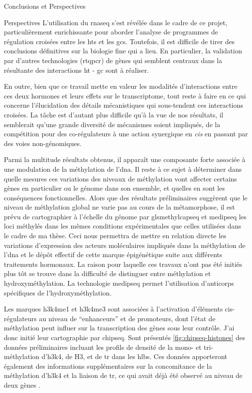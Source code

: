 \documentclass[../main.tex]{subfiles}
\begin{document}
\begin{chapter}{Conclusions et Perspectives}
\begin{section}{Perspectives}
L'utilisation du \gls{rnaseq} s'est révélée dans le cadre de ce projet, particulièrement enrichissante pour aborder l'analyse de programmes de régulation croisées entre les \glspl{ht} et les \glspl{gc}.
Toutefois, il est difficile de tirer des conclusions définitives sur la biologie fine qui a lieu.
En particulier, la validation par d'autres technologies (\gls{rtqpcr}) de gènes qui semblent centraux dans la résultante des interactions \gls{ht} - \gls{gc} sont à réaliser.
\par
En outre, bien que ce travail mette en valeur les modalités d'interactions entre ces deux hormones et leurs effets sur le transcriptome, tout reste à faire en ce qui concerne l'élucidation des détails mécanistiques qui sous-tendent ces interactions croisées.
La tâche est d'autant plus difficile qu'à la vue de nos résultats, il semblerait qu'une grande diversité de mécanismes soient impliqués, de la compétition pour des co-régulateurs à une action synergique en \textit{cis} en passant par des voies non-génomiques.
\par
Parmi la multitude résultats obtenus, il apparaît une composante forte associée à une modulation de la méthylation de l'\gls{dna}.
Il reste à ce sujet à déterminer dans quelle mesures ces variations des niveaux de méthylation vont affecter certains gènes en particulier ou le génome dans son ensemble, et quelles en sont les conséquences fonctionnelles.
Alors que des résultats préliminaires suggèrent que le niveau de méthylation global ne varie pas au cours de la métamorphose, il est prévu de cartographier à l'échelle du génome par gls{methylcapseq} et \gls{medipseq} les loci méthylés dans les mêmes conditions expérimentales que celles utilisées dans le cadre de ma thèse.
Ceci nous permettra de mettre en relation directe les variations d'expression des acteurs moléculaires impliqués dans la méthylation de l'\gls{dna} et le dépôt effectif de cette marque épigénétique suite aux différents traitements hormonaux.
La raison pour laquelle ces travaux n'ont pas été initiés plus tôt se trouve dans la difficulté de distinguer entre méthylation et hydroxyméthylation.
La technologie \gls{medipseq} permet l'utilisation d'anticorps spécifiques de l'hydroxyméthylation.
\par
Les marques \gls{h3k4me1} et \gls{h3k4me3} sont associées à l'activation d'éléments cis-régulateurs au niveau de ``enhanceurs'' et de promoteurs, dont l'état de méthylation peut influer sur la transcription des gènes sous leur contrôle.
J'ai donc initié leur cartographie par \gls{chipseq}.
Sont présentés \autoref{fig:chipseq-histones} des données préliminaires incluant les profils de densité de la mono- et tri-méthylation d'\gls{h3k4}, de H3, et de \gls{tr} dans les \glspl{hlb}.
Ces données apporteront également des informations supplémentaires sur la concomitance de la méthylation d'\gls{h3k4} et la liaison de \gls{tr}, ce qui avait déjà été observé au niveau de deux gènes \citep{Bilesimo2011}.


\end{section}
\end{chapter}
\end{document}
